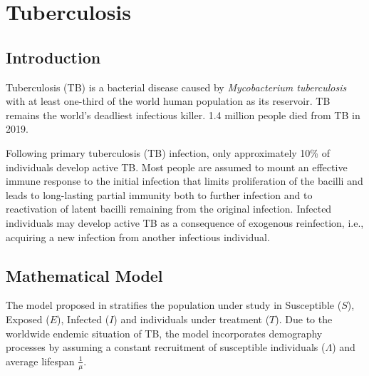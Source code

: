 \documentclass{book}
\begin{document}
\section{Tuberculosis}
\subsection*{Introduction}
Tuberculosis (TB) is a bacterial disease caused  by {\it Mycobacterium tuberculosis} with at least one-third of the world human population as its reservoir. %
TB remains the world’s deadliest infectious killer. 1.4 million people died from TB in 2019. %

Following primary tuberculosis (TB)  infection, only  approximately  10\% of  individuals develop active TB. Most people are assumed to mount an effective immune response to the initial infection that limits proliferation of the bacilli and leads to long-lasting partial immunity both to further infection and to reactivation of latent bacilli remaining from the original infection. Infected individuals may develop active TB as a consequence of exogenous reinfection, i.e.,  acquiring  a  new  infection  from  another  infectious  individual.

\subsection*{Mathematical Model}
The model proposed in \cite{feng2000model} stratifies the population under study in Susceptible ($S$), Exposed ($E$), Infected ($I$) and individuals under treatment ($T$).
Due to the worldwide endemic situation of TB, the model incorporates demography processes by assuming a constant recruitment of susceptible individuals ($\Lambda$) and average lifespan $\frac{1}{\mu}$. 
\end{document}
